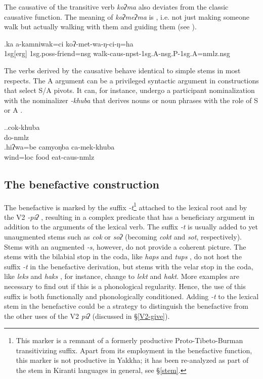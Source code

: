 The causative of the transitive verb \emph{koʔma}  also deviates  from the classic causative function. The meaning of \emph{koʔmeʔma} is , i.e. not just making someone walk but actually walking with them and guiding them (see \Next). 

\exg.ka a-kamniwak=ci  koʔ-met-wa-ŋ-ci-ŋ=ha\\
{\sc 1sg[erg]}  {\sc 1sg.poss-}friend{\sc =nsg} walk{\sc -caus-npst-1sg.A-nsg.P-1sg.A=nmlz.nsg} \\
 
  
 
The verbs derived by the causative behave identical to simple stems in most respects. The A argument can be a privileged syntactic argument in constructions that select S/A pivots. It can, for instance, undergo a participant nominalization with the nominalizer \emph{-khuba} that derives nouns or noun phrases with the role of S or A \Next.  
 
 \ex.\ag.cok-khuba\\
do{\sc -nmlz}\\
\bg.hiʔwa=be    camyoŋba ca-mek-khuba  \\
wind{\sc =loc} food eat{\sc -caus-nmlz}\\




\subsection{The benefactive construction}\label{benefactive}

The benefactive is marked by the suffix \emph{-t}\footnote{This marker is a remnant of a  formerly productive Proto-Tibeto-Burman  transitivizing suffix. Apart from its employment in the benefactive function, this marker is not productive in Yakkha; it has been re-analyzed as part of the stem in Kiranti languages in general, see §\ref{stem}.} attached to the lexical root and by the V2 \emph{-piʔ} , resulting in a complex predicate that has a beneficiary argument in addition to the arguments of the lexical verb. The suffix \emph{-t} is usually added to yet unaugmented stems such as \emph{cok}  or \emph{soʔ}  (becoming \emph{cokt} and \emph{sot}, respectively). Stems with an augmented \emph{-s}, however, do not provide a coherent picture. The stems with the bilabial stop in the coda, like \emph{haps}  and \emph{tups} , do not host the suffix \emph{-t} in the benefactive derivation, but stems with the velar stop in the coda, like \emph{leks}  and \emph{haks} , for instance, change to \emph{lekt} and \emph{hakt}. More examples are necessary to find out if this is a phonological regularity. Hence, the use of this suffix is both functionally and phonologically conditioned. Adding \emph{-t} to the lexical stem in the benefactive could be a strategy to distinguish the benefactive from the other uses of the V2 \emph{piʔ} (discussed in §\ref{V2-give}).

